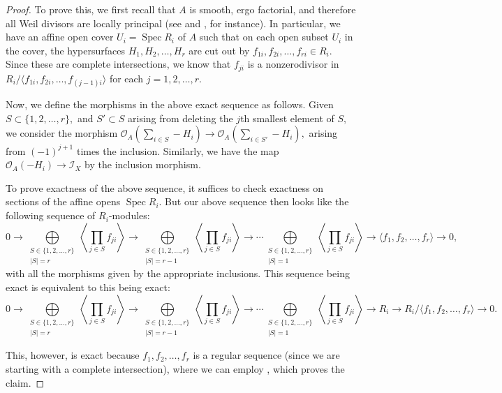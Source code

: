 \documentclass{article}
\theoremstyle{definition}
\theoremstyle{remark}
\DeclareMathOperator{\Spec}{Spec}
\begin{document}
\begin{proof}
To prove this, we first recall that $A$ is smooth, ergo factorial, and therefore all Weil divisors are locally principal (see \cite[Lemma 12.1.7]{vakil} and \cite[0AG0]{stacks-project}, for instance). In particular, we have an affine open cover $U_i = \Spec R_i$ of $A$ such that on each open subset $U_i$ in the cover, the hypersurfaces $H_1, H_2, \ldots, H_r$ are cut out by $f_{1i}, f_{2i}, \ldots, f_{ri} \in R_i.$ Since these are complete intersections, we know that $f_{ji}$ is a nonzerodivisor in $R_i/\langle f_{1i}, f_{2i}, \ldots, f_{(j-1)i} \rangle$ for each $j = 1, 2, \ldots, r.$
\par Now, we define the morphisms in the above exact sequence as follows. Given $S \subset \{1, 2, \ldots, r\},$ and $S' \subset S$ arising from deleting the $j$th smallest element of $S,$ we consider the morphism $\mathcal{O}_A(\sum\limits_{i\in S} -H_i) \rightarrow \mathcal{O}_A(\sum\limits_{i\in S'} -H_i),$ arising from $(-1)^{j+1}$ times the inclusion. Similarly, we have the map $\mathcal{O}_A(-H_i) \rightarrow \mathcal{I}_X$ by the inclusion morphism.
\par To prove exactness of the above sequence, it suffices to check exactness on sections of the affine opens $\Spec R_i.$ But our above sequence then looks like the following sequence of $R_i$-modules:
\[0 \rightarrow \bigoplus\limits_{\substack{S \in \{1, 2, \ldots, r\}\\|S| = r}} \left\langle \prod\limits_{j \in S }f_{ji} \right\rangle \rightarrow \bigoplus\limits_{\substack{S \in \{1, 2, \ldots, r\}\\|S| = r-1}} \left\langle \prod\limits_{j \in S }f_{ji} \right\rangle  \rightarrow \cdots \bigoplus\limits_{\substack{S \in \{1, 2, \ldots, r\}\\|S| = 1}} \left\langle \prod\limits_{j \in S }f_{ji} \right\rangle \rightarrow \langle f_1, f_2, \ldots, f_r \rangle \rightarrow 0,\] with all the morphisms given by the appropriate inclusions. This sequence being exact is equivalent to this being exact:
\[0 \rightarrow \bigoplus\limits_{\substack{S \in \{1, 2, \ldots, r\}\\|S| = r}} \left\langle \prod\limits_{j \in S }f_{ji} \right\rangle \rightarrow \bigoplus\limits_{\substack{S \in \{1, 2, \ldots, r\}\\|S| = r-1}} \left\langle \prod\limits_{j \in S }f_{ji} \right\rangle  \rightarrow \cdots \bigoplus\limits_{\substack{S \in \{1, 2, \ldots, r\}\\|S| = 1}} \left\langle \prod\limits_{j \in S }f_{ji} \right\rangle \rightarrow R_i \rightarrow R_i/\langle f_1, f_2, \ldots, f_r \rangle \rightarrow 0.\]
\par This, however, is exact because $f_1, f_2, \ldots, f_r$ is a regular sequence (since we are starting with a complete intersection), where we can employ \cite[Tag 062F]{stacks-project}, which proves the claim.
\end{proof}
\end{document}
